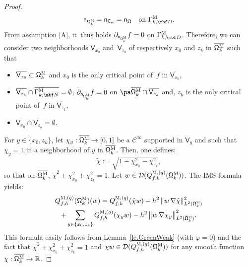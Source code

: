 \begin{proof}
\begin{equation}\label{eq.=normaCalpha}
\mathsf n_{{\mathsf \Omega_k^{\textsc{M}}}}=\mathsf n_{ \mathsf C_\alpha}=\mathsf n_{ \Omega}\quad \text{on }\Gamma_{k,\mbf D}^{\textsc{M}}.
\end{equation}
From assumption \ref{A}, it~thus holds $\partial_{\mathsf n_{ \mathsf \Omega_k^{\textsc{M}}}}f=0$ on $\Gamma_{k,\mbf D}^{\textsc{M}}$.
Therefore, we can consider two neighborhoods $\mathsf V_{x_0}$ and~$\mathsf V_{z_k}$ of respectively $x_0$ and $z_k$ in $\overline {\mathsf \Omega_k^{\textsc{M}}}$ such that
\begin{itemize}
\item
$\overline{\mathsf V_{x_0}}\subset {\mathsf \Omega_k^{\textsc{M}}}$ and $x_0$ is the only critical point of~$f$ in $\overline{\mathsf V_{x_0}}$,
\item
$\overline {\mathsf V_{z_k}} \cap \overline{\Gamma_{k,\mbf N}^{\textsc{M}}}=\emptyset$, $ \partial_{\mathsf n_{ \mathsf \Omega_k^{\textsc{M}}}}f=0$ on $\pa\overline {\mathsf \Omega_k^{\textsc{M}}} \cap\overline {\mathsf V_{z_k}}$
and, $z_k$ is the only critical point of~$f$ in $\overline {\mathsf V_{z_k}}$,
\item
$\overline{\mathsf V_{x_0}}\cap \overline {\mathsf V_{z_k}}=\emptyset$.
\end{itemize}
For $y\in \{x_0,z_k\}$, let $\chi_y: \overline {\mathsf \Omega_k^{\textsc{M}}}\to [0,1]$ be a $\mathcal C^\infty$ supported in $\mathsf V_y$ and such that $\chi_y=1$ in a neighborhood of $y$ in $\overline {\mathsf \Omega_k^{\textsc{M}}}$.
Then, one defines:\vspace*{-3pt}
\[
\tilde \chi:=\sqrt{1- \chi_{x_0}^2-\chi_{z_k}^2},
\]
so that on $\overline {\mathsf \Omega_k^{\textsc{M}}}$, $\tilde \chi^2+\chi_{x_0}^2+\chi_{z_k}^2=1$.
Let $w\in \mathcal D(Q_{f,h}^{\textsc{M},(q)}(\mathsf \Omega_k^{\textsc{M}}))$.
The IMS formula~\cite{CFKS,helffer-nier-06} yields:\vspace*{-5pt}
\begin{multline*}
Q_{f,h}^{\textsc{M},(q)}(\mathsf \Omega_k^{\textsc{M}})(w) = Q_{f,h}^{\textsc{M},(q)}(\tilde \chi w) - h^2\, \Vert w\, \nabla \tilde \chi \Vert_{L^2(\mathsf \Omega_k^{\textsc{M}})}^2\\
+ \sum_{y\in \{x_0,z_k\}} Q_{f,h}^{\textsc{M},(q)}(\chi_y w) - h^2\,\big \Vert w\, \nabla \chi_y \big \Vert_{L^2(\mathsf \Omega_k^{\textsc{M}})}^2.
\end{multline*}
This formula easily follows from Lemma~\ref{le.GreenWeak} (with $\varphi=0$) and the fact that $\tilde \chi^2+\chi_{x_0}^2+\chi_{z_k}^2=1$ and $\chi w\in \mathcal D(Q_{f,h}^{\textsc{M},(q)}(\mathsf \Omega_k^{\textsc{M}}))$ for any smooth function $\chi:\overline {\mathsf \Omega_k^{\textsc{M}}}\to \mathbb R$.


\end{proof}
